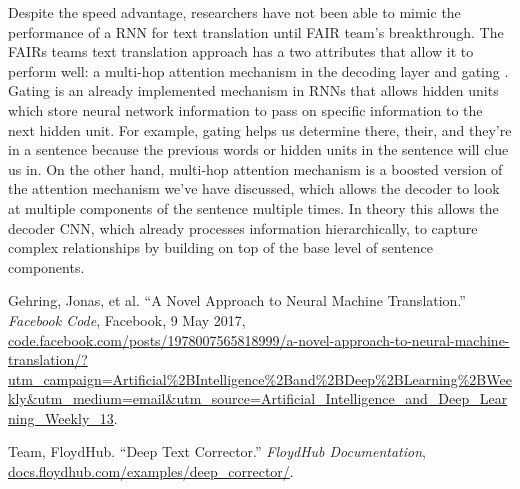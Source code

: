 \documentclass[11pt,a4paper]{scrartcl}
\theoremstyle{definition}
\begin{document}
Despite the speed advantage, researchers have not been able to mimic the performance of a RNN for text translation until FAIR team’s breakthrough. The FAIRs teams text translation approach has a two attributes that allow it to perform well: a multi-hop attention mechanism in the decoding layer and gating \cite{Gehring}. Gating is an already implemented mechanism in RNNs that allows hidden units which store neural network information to pass on specific information to the next hidden unit. For example, gating helps us determine there, their, and they’re in a sentence because the previous words or hidden units in the sentence will clue us in. On the other hand, multi-hop attention mechanism is a boosted version of the attention mechanism we’ve have discussed, which allows the decoder to look at multiple components of the sentence multiple times. In theory this allows the decoder CNN, which already processes information hierarchically, to capture complex relationships by building on top of the base level of sentence components. 

\vspace{1em}

\begin{thebibliography}{7}
 Gehring, Jonas, et al. “A Novel Approach to Neural Machine Translation.” \emph{Facebook Code}, Facebook, 9 May 2017, \url{code.facebook.com/posts/1978007565818999/a-novel-approach-to-neural-machine-translation/?utm_campaign=Artificial%2BIntelligence%2Band%2BDeep%2BLearning%2BWeekly&utm_medium=email&utm_source=Artificial_Intelligence_and_Deep_Learning_Weekly_13}.

 Team, FloydHub. “Deep Text Corrector.” \emph{FloydHub Documentation}, \url{docs.floydhub.com/examples/deep_corrector/}.

\end{thebibliography}
\end{document}
